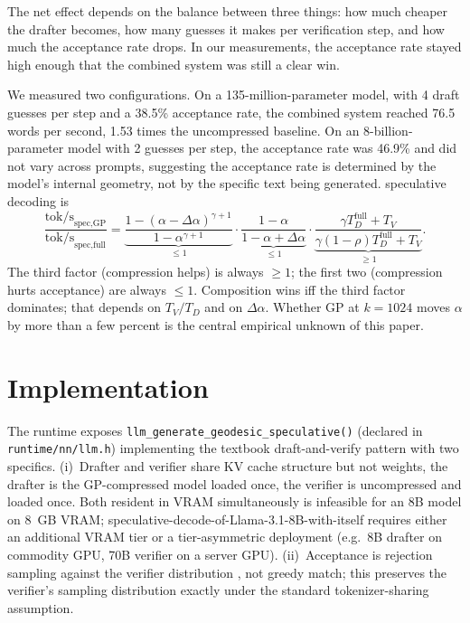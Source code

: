 \documentclass[11pt]{article}
\begin{document}
The net effect depends on the balance between three things: how much cheaper
the drafter becomes, how many guesses it makes per verification step, and
how much the acceptance rate drops. In our measurements, the acceptance rate
stayed high enough that the combined system was still a clear win.

We measured two configurations. On a 135-million-parameter model, with 4
draft guesses per step and a 38.5\% acceptance rate, the combined system
reached 76.5 words per second, 1.53 times the uncompressed baseline. On an
8-billion-parameter model with 2 guesses per step, the acceptance rate was
46.9\% and did not vary across prompts, suggesting the acceptance rate is
determined by the model's internal geometry, not by the specific text being
generated.
speculative decoding is
\begin{equation}
\label{eq:netspeedup}
\frac{\text{tok/s}_\text{spec,GP}}{\text{tok/s}_\text{spec,full}}
=
\underbrace{\frac{1-(\alpha-\Delta\alpha)^{\gamma+1}}{1-\alpha^{\gamma+1}}}_{\leq 1}
\cdot
\underbrace{\frac{1-\alpha}{1-\alpha+\Delta\alpha}}_{\leq 1}
\cdot
\underbrace{\frac{\gamma T_D^\text{full}+T_V}{\gamma(1-\rho)T_D^\text{full}+T_V}}_{\geq 1}.
\end{equation}
The third factor (compression helps) is always $\geq 1$; the first two
(compression hurts acceptance) are always $\leq 1$.  Composition wins iff
the third factor dominates; that depends on $T_V/T_D$ and on $\Delta\alpha$.
Whether GP at $k{=}1024$ moves $\alpha$ by more than a few percent is the
central empirical unknown of this paper.

\section{Implementation}
The runtime exposes
\texttt{llm\_generate\_geodesic\_speculative()} (declared in
\texttt{runtime/nn/llm.h}) implementing the textbook draft-and-verify
pattern with two specifics.  (i)~Drafter and verifier share KV
cache structure but not weights, the drafter is the GP-compressed
model loaded once, the verifier is uncompressed and loaded once.  Both
resident in VRAM simultaneously is infeasible for an 8B model on 8~GB
VRAM; speculative-decode-of-Llama-3.1-8B-with-itself requires either an
additional VRAM tier or a tier-asymmetric deployment (e.g.\ 8B drafter
on commodity GPU, 70B verifier on a server GPU).  (ii)~Acceptance
is rejection sampling against the verifier distribution
\cite{leviathan2023speculative,chen2023speculative}, not greedy match;
this preserves the verifier's sampling distribution exactly under the
standard tokenizer-sharing assumption.
\end{document}
